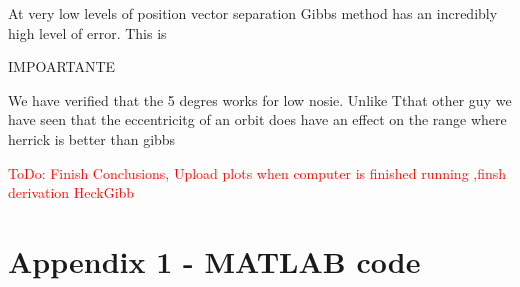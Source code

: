 \documentclass[12pt]{article}
\begin{document}
	At very low levels of position vector separation Gibbs method has an incredibly high level of error. This is 
	
	IMPOARTANTE
	
	We have verified that the 5 degres works for low nosie.
	Unlike Tthat other guy we have seen that the eccentricitg of an orbit does have an effect on the range where herrick is better than gibbs
	
	
	
	
	\textcolor{red}{ToDo: Finish Conclusions, Upload plots when computer is finished running ,finsh derivation HeckGibb}
		\fi
		
		
		

		
		\newpage
		\singlespacing
		\section*{Appendix 1 - MATLAB code}
		
	
	
\end{document}
